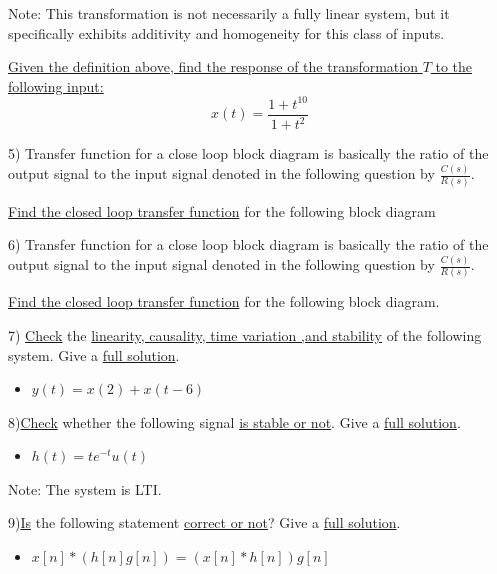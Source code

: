 Note: This transformation is not necessarily a fully linear system, but it specifically exhibits additivity and homogeneity for this class of inputs.

\underline{Given the definition above, find the response of the transformation $T$ to the following input:}
\[
    x(t) = \frac{1 + t^{10}}{1 + t^2}
\]

\vspace{1.5em}

5) Transfer function for a close loop block diagram is basically the ratio of the output signal to the input signal denoted in the following question by $\frac{C(s)}{R(s)}$.

\underline{Find the closed loop transfer function} for the following block diagram


\vspace{1.5em}

6) Transfer function for a close loop block diagram is basically the ratio of the output signal to the input signal denoted in the following question by $\frac{C(s)}{R(s)}$.

\underline{Find the closed loop transfer function} for the following block diagram.

\vspace{1.5em}

7) \underline{Check} the \underline{linearity, causality, time variation ,and stability} of the following system. Give a \underline{full solution}.
\begin{itemize}
    \item $y(t) = x(2) + x(t - 6)$
\end{itemize}

\vspace{1.5em}

8)\underline{Check} whether the following signal \underline{is stable or not}. Give a \underline{full solution}.
\begin{itemize}
    \item $h(t) = te^{-t}u(t)$
\end{itemize}

Note: The system is LTI.

\vspace{1.5em}

9)\underline{Is} the following statement \underline{correct or not}? Give a \underline{full solution}.
\begin{itemize}
    \item $x[n] * (h[n]g[n]) = (x[n] * h[n])g[n]$
\end{itemize}

\RTL